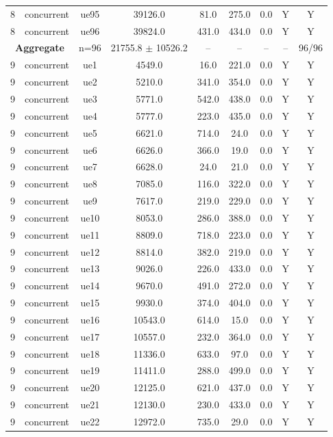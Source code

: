 \begin{table}[ht]
\begin{tabular}{|c|c|c|c|c|c|c|c|c|}
8 & concurrent & ue95 & 39126.0 & 81.0 & 275.0 & 0.0 & Y & Y \\
8 & concurrent & ue96 & 39824.0 & 431.0 & 434.0 & 0.0 & Y & Y \\
\multicolumn{2}{|c|}{\textbf{Aggregate}} & n=96 & 21755.8 $\pm$ 10526.2 & -- & -- & -- & -- & 96/96 \\
\hline
9 & concurrent & ue1 & 4549.0 & 16.0 & 221.0 & 0.0 & Y & Y \\
9 & concurrent & ue2 & 5210.0 & 341.0 & 354.0 & 0.0 & Y & Y \\
9 & concurrent & ue3 & 5771.0 & 542.0 & 438.0 & 0.0 & Y & Y \\
9 & concurrent & ue4 & 5777.0 & 223.0 & 435.0 & 0.0 & Y & Y \\
9 & concurrent & ue5 & 6621.0 & 714.0 & 24.0 & 0.0 & Y & Y \\
9 & concurrent & ue6 & 6626.0 & 366.0 & 19.0 & 0.0 & Y & Y \\
9 & concurrent & ue7 & 6628.0 & 24.0 & 21.0 & 0.0 & Y & Y \\
9 & concurrent & ue8 & 7085.0 & 116.0 & 322.0 & 0.0 & Y & Y \\
9 & concurrent & ue9 & 7617.0 & 219.0 & 229.0 & 0.0 & Y & Y \\
9 & concurrent & ue10 & 8053.0 & 286.0 & 388.0 & 0.0 & Y & Y \\
9 & concurrent & ue11 & 8809.0 & 718.0 & 223.0 & 0.0 & Y & Y \\
9 & concurrent & ue12 & 8814.0 & 382.0 & 219.0 & 0.0 & Y & Y \\
9 & concurrent & ue13 & 9026.0 & 226.0 & 433.0 & 0.0 & Y & Y \\
9 & concurrent & ue14 & 9670.0 & 491.0 & 272.0 & 0.0 & Y & Y \\
9 & concurrent & ue15 & 9930.0 & 374.0 & 404.0 & 0.0 & Y & Y \\
9 & concurrent & ue16 & 10543.0 & 614.0 & 15.0 & 0.0 & Y & Y \\
9 & concurrent & ue17 & 10557.0 & 232.0 & 364.0 & 0.0 & Y & Y \\
9 & concurrent & ue18 & 11336.0 & 633.0 & 97.0 & 0.0 & Y & Y \\
9 & concurrent & ue19 & 11411.0 & 288.0 & 499.0 & 0.0 & Y & Y \\
9 & concurrent & ue20 & 12125.0 & 621.0 & 437.0 & 0.0 & Y & Y \\
9 & concurrent & ue21 & 12130.0 & 230.0 & 433.0 & 0.0 & Y & Y \\
9 & concurrent & ue22 & 12972.0 & 735.0 & 29.0 & 0.0 & Y & Y \\

\end{tabular}
\end{table}
